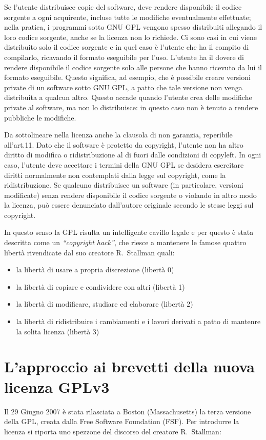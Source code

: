 Se l'utente distribuisce copie del software, deve rendere disponibile il codice sorgente a ogni acquirente, incluse tutte le modifiche eventualmente effettuate; nella pratica, i programmi sotto GNU GPL vengono spesso distribuiti allegando il loro codice sorgente, anche se la licenza non lo richiede. Ci sono casi in cui viene distribuito solo il codice sorgente e in quel caso è l'utente che ha il compito di compilarlo, ricavando il formato eseguibile per l'uso.
L'utente ha il dovere di rendere disponibile il codice sorgente solo alle persone che hanno ricevuto da lui il formato eseguibile. Questo significa, ad esempio, che è possibile creare versioni private di un software sotto GNU GPL, a patto che tale versione non venga distribuita a qualcun altro. Questo accade quando l'utente crea delle modifiche private al software, ma non lo distribuisce: in questo caso non è tenuto a rendere pubbliche le modifiche.

Da sottolineare nella licenza anche la clausola di non garanzia, reperibile all'art.11. Dato che il software è protetto da copyright, l'utente non ha altro diritto di modifica o ridistribuzione al di fuori dalle condizioni di copyleft. In ogni caso, l'utente deve accettare i termini della GNU GPL se desidera esercitare diritti normalmente non contemplati dalla legge sul copyright, come la ridistribuzione. Se qualcuno distribuisce un software (in particolare, versioni modificate) senza rendere disponibile il codice sorgente o violando in altro modo la licenza, può essere denunciato dall'autore originale secondo le stesse leggi sul copyright.

In questo senso la GPL risulta un intelligente cavillo legale e per questo è stata descritta come un \textit{``copyright hack''}, che riesce a mantenere le famose quattro libertà rivendicate dal suo creatore R.~Stallman quali:
\begin{itemize}
\item la libertà di usare a propria discrezione (libertà 0)
\item la libertà di copiare e condividere con altri (libertà 1)
\item la libertà di modificare, studiare ed elaborare (libertà 2)
\item la libertà di ridistribuire i cambiamenti e i lavori derivati a patto di mantenre la solita licenza (libertà 3)
\end{itemize}


\section{L'approccio ai brevetti della nuova licenza GPLv3}
Il 29 Giugno 2007 è stata rilasciata a Boston (Massachusetts) la terza versione della GPL, creata dalla  Free Software Foundation (FSF).
Per introdurre la licenza si riporta uno spezzone del discorso del creatore R.~Stallman:

